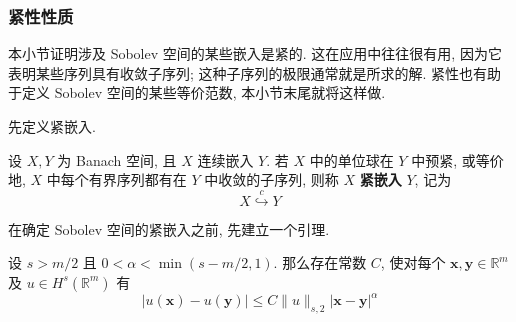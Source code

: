 \subsubsection{紧性性质}\label{subsec:sobolev-compactness-properties}

本小节证明涉及 Sobolev 空间的某些嵌入是紧的. 这在应用中往往很有用, 因为它表明某些序列具有收敛子序列; 这种子序列的极限通常就是所求的解. 紧性也有助于定义 Sobolev 空间的某些等价范数, 本小节末尾就将这样做.

先定义紧嵌入.

\begin{Definition}
\label{def:compact-imbedding}
设 $X,Y$ 为 Banach 空间, 且 $X$ 连续嵌入 $Y$. 若 $X$ 中的单位球在 $Y$ 中预紧, 或等价地, $X$ 中每个有界序列都有在 $Y$ 中收敛的子序列, 则称 $X$ \textbf{紧嵌入} $Y$, 记为\[X\overset{c}{\hookrightarrow}Y\]
\end{Definition}

在确定 Sobolev 空间的紧嵌入之前, 先建立一个引理.

\begin{Lemma}
\label{lem:sobolev-holder-continuity}
设 $s>m/2$ 且 $0<\alpha<\min(s-m/2,1)$. 那么存在常数 $C$, 使对每个 $\bm{x},\bm{y}\in\mathbb{R}^m$ 及 $u\in H^s(\mathbb{R}^m)$ 有
\begin{equation}\label{eq:sobolev-holder-continuity-estimate}
|u(\bm{x})-u(\bm{y})|\leq C\|u\|_{s,2}|\bm{x}-\bm{y}|^{\alpha}
\end{equation}

\end{Lemma}

\begingroup
{}
\renewcommand{\endProof}{\par\nobreak\hfill$\blacksquare$\par\vspace{0.1cm}}
\endgroup

